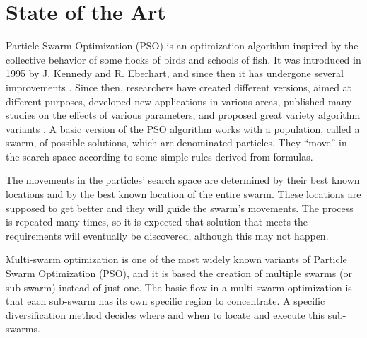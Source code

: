 \documentclass[runningheads]{llncs}
\begin{document}
\section{State of the Art}
\label{sec:soa}

Particle Swarm Optimization (PSO) is an optimization algorithm
inspired by the collective behavior of some flocks of birds and schools 
of fish. It was introduced in 1995 by  J. Kennedy and
R. Eberhart, and since then it has undergone several improvements \cite{b1}. %
Since then, researchers have created different versions, aimed at different
purposes, developed new applications in various areas, published many
studies on the effects of various parameters, and proposed great
variety algorithm variants \cite{b2}. %
A basic version of the PSO algorithm
works with a population, called a swarm, of possible solutions, which
are denominated particles. They ``move'' in the search space according to
some simple rules derived from formulas. %

The movements in the particles' search space are
determined by their best known locations and by the best known location
of the entire swarm. %
These locations are supposed to get better and they will
guide the swarm's movements. The process is repeated many times, so it
is expected that solution that meets the requirements will eventually be
discovered, although this may not happen\cite{b3}. %


Multi-swarm optimization is one of the most widely known variants of Particle Swarm Optimization
(PSO), and it is based the creation of multiple swarms (or sub-swarm)
instead of just one. %
The basic flow in
a multi-swarm optimization is that each sub-swarm has its own specific 
region to concentrate. A specific diversification method decides where and
when to locate and execute this sub-swarms. %
\end{document}
